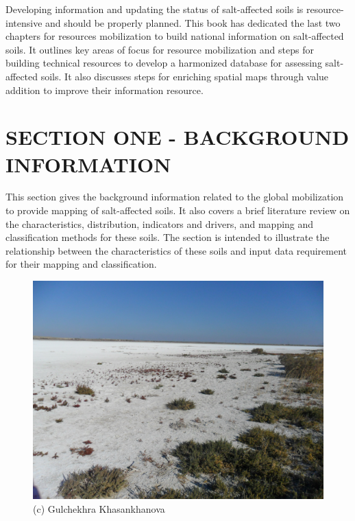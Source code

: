 \documentclass[
  10pt,
  b5paper,
]{book}
\begin{document}
Developing information and updating the status of salt-affected soils is resource-intensive and should be
properly planned. This book has dedicated the last two chapters for resources mobilization to build
national information on salt-affected soils. It outlines key areas of focus for resource mobilization and
steps for building technical resources to develop a harmonized database for assessing salt-affected soils.
It also discusses steps for enriching spatial maps through value addition to improve their information
resource.

\hypertarget{section-one---background-information}{%
\chapter*{SECTION ONE - BACKGROUND INFORMATION}\label{section-one---background-information}}

This section gives the background information related to the global mobilization to provide mapping of
salt-affected soils. It also covers a brief literature review on the characteristics, distribution, indicators and
drivers, and mapping and classification methods for these soils. The section is intended to illustrate the
relationship between the characteristics of these soils and input data requirement for their mapping and
classification.

\begin{figure}
\centering
\includegraphics{figures/images/SAM_1351.jpg}
\caption{(c) Gulchekhra Khasankhanova}
\end{figure}
\end{document}

